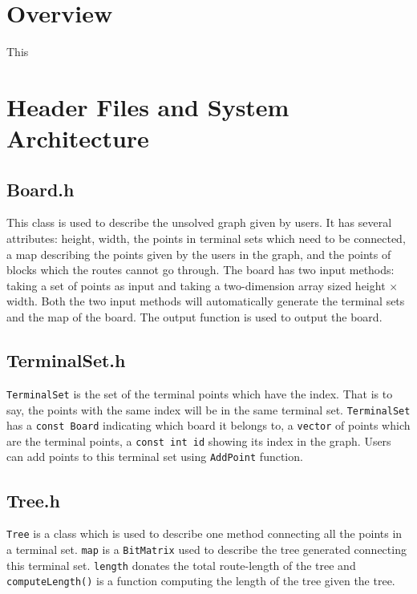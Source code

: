 \documentclass[12pt, a4paper]{article}
\begin{document}
	\section{Overview}
	
		This 
	
	\section{Header Files and System Architecture}
	
		\subsection{Board.h}
		
			This class is used to describe the unsolved graph given by users. It has several attributes: height, width, the points in terminal sets which need to be connected, a map describing the points given by the users in the graph, and the points of blocks which the routes cannot go through. The board has two input methods: taking a set of points as input and taking a two-dimension array sized height $\times$ width. Both the two input methods will automatically generate the terminal sets and the map of the board. The output function is used to output the board.
		
		\subsection{TerminalSet.h}
		
			\texttt{TerminalSet} is the set of the terminal points which have the index. That is to say, the points with the same index will be in the same terminal set. \texttt{TerminalSet} has a \texttt{const Board} indicating which board it belongs to, a \texttt{vector} of points which are the terminal points, a \texttt{const int id} showing its index in the graph. Users can add points to this terminal set using \texttt{AddPoint} function.
				
		\subsection{Tree.h}

			\texttt{Tree} is a class which is used to describe one method connecting all the points in a terminal set. \texttt{map} is a \texttt{BitMatrix} used to describe the tree generated connecting this terminal set. \texttt{length} donates the total route-length of the tree and \texttt{computeLength()} is a function computing the length of the tree given the tree.
		
\end{document}
